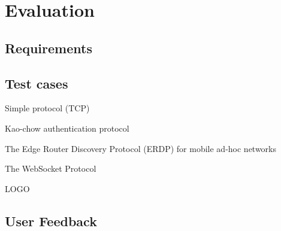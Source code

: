 \chapter{Evaluation}
\label{chap:evaluation}

\section{Requirements}

\section{Test cases}

Simple protocol (TCP)

Kao-chow authentication protocol

The Edge Router Discovery Protocol (ERDP) for mobile ad-hoc networks

The WebSocket Protocol

LOGO

\section{User Feedback}
